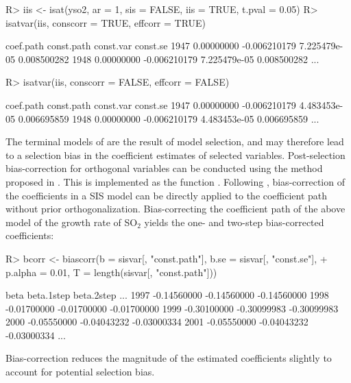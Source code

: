 \documentclass[article,nojss]{jss}
\begin{document}
\begin{CodeChunk}
\begin{CodeInput}
R> iis <- isat(yso2, ar = 1, sis = FALSE, iis = TRUE, t.pval = 0.05)
R> isatvar(iis, conscorr = TRUE, effcorr = TRUE)
\end{CodeInput}
\begin{CodeOutput}
       coef.path   const.path    const.var    const.se
1947  0.00000000 -0.006210179 7.225479e-05 0.008500282
1948  0.00000000 -0.006210179 7.225479e-05 0.008500282
...
\end{CodeOutput}
\begin{CodeInput}
R> isatvar(iis,  conscorr = FALSE, effcorr = FALSE)
\end{CodeInput}
\begin{CodeOutput}
       coef.path   const.path    const.var    const.se
1947  0.00000000 -0.006210179 4.483453e-05 0.006695859
1948  0.00000000 -0.006210179 4.483453e-05 0.006695859
...
\end{CodeOutput}
\end{CodeChunk}
%
The terminal models of  are the result of model selection, and may therefore lead to a selection bias in the coefficient estimates of selected variables. Post-selection bias-correction for orthogonal variables can be conducted using the method proposed in \cite{HendryKrolzig2005}. This is implemented as the function . Following \cite{pretis2015istest}, bias-correction of the coefficients in a SIS model can be directly applied to the coefficient path without prior orthogonalization. Bias-correcting the coefficient path of the above model of the growth rate of SO$_2$ yields the one- and two-step bias-corrected coefficients:
%
\begin{CodeChunk}
\begin{CodeInput}
R> bcorr <- biascorr(b = sisvar[, "const.path"], b.se = sisvar[, "const.se"],
+    p.alpha = 0.01, T = length(sisvar[, "const.path"]))
\end{CodeInput}
\begin{CodeOutput}
            beta  beta.1step  beta.2step
...
1997 -0.14560000 -0.14560000 -0.14560000
1998 -0.01700000 -0.01700000 -0.01700000
1999 -0.30100000 -0.30099983 -0.30099983
2000 -0.05550000 -0.04043232 -0.03000334
2001 -0.05550000 -0.04043232 -0.03000334
...	
\end{CodeOutput}
\end{CodeChunk}
%
Bias-correction reduces the magnitude of the estimated coefficients slightly to account for potential selection bias.
\end{document}
